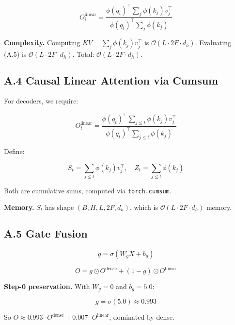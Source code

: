 \begin{equation}
O_i^\text{linear} = \frac{\phi(q_i)^\top \sum_j \phi(k_j) v_j^\top}{\phi(q_i)^\top \sum_j \phi(k_j)}
\end{equation}

\textbf{Complexity.} Computing $KV = \sum_j \phi(k_j) v_j^\top$ is 
$\mathcal{O}(L \cdot 2F \cdot d_h)$. Evaluating (A.5) is $\mathcal{O}(L \cdot 2F \cdot d_h)$. Total: $\mathcal{O}(L \cdot 2F \cdot d_h)$.

\subsection{A.4 Causal Linear Attention via Cumsum}

For decoders, we require:

\begin{equation}
O_t^\text{linear} = \frac{\phi(q_t)^\top \sum_{j \leq t} \phi(k_j) v_j^\top}{\phi(q_t)^\top \sum_{j \leq t} \phi(k_j)}
\end{equation}

Define:

\begin{equation}
S_t = \sum_{j \leq t} \phi(k_j) v_j^\top, \quad
Z_t = \sum_{j \leq t} \phi(k_j)
\end{equation}

Both are cumulative sums, computed via \texttt{torch.cumsum}.

\textbf{Memory.} $S_t$ has shape $(B, H, L, 2F, d_h)$, which is 
$\mathcal{O}(L \cdot 2F \cdot d_h)$ memory.

\subsection{A.5 Gate Fusion}

\begin{equation}
g = \sigma(W_g X + b_g)
\end{equation}

\begin{equation}
O = g \odot O^\text{dense} + (1 - g) \odot O^\text{linear}
\end{equation}

\textbf{Step-0 preservation.} With $W_g = 0$ and $b_g = 5.0$:

\begin{equation}
g = \sigma(5.0) \approx 0.993
\end{equation}

So $O \approx 0.993 \cdot O^\text{dense} + 0.007 \cdot O^\text{linear}$, 
dominated by dense.

